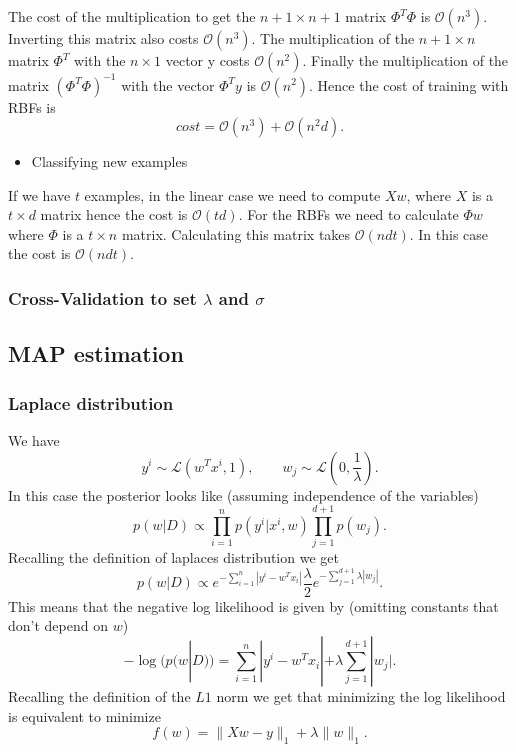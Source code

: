 \documentclass[11pt]{article}
\theoremstyle{plain}
\begin{document}
The cost of the multiplication to get the $n+1\times n+1$
matrix  $\Phi^{T}\Phi$ is $\mathcal{O}(n^{3})$. Inverting this matrix also costs $\mathcal{O}(n^{3})$.
The multiplication of the $n+1\times n$ matrix $\Phi^{T}$ with the $n\times 1$ vector y costs
$\mathcal{O}(n^{2})$. Finally the multiplication of the matrix $(\Phi^{T}\Phi)^{-1}$ with the vector
$\Phi^{T}y$ is $\mathcal{O}(n^{2})$. Hence the cost of training with RBFs is
\begin{equation*}
cost=\mathcal{O}(n^{3})+\mathcal{O}(n^{2}d).
\end{equation*}
\begin{itemize}
\item{Classifying new examples}
\end{itemize}
If we have $t$ examples, in the linear case we need to compute $Xw$, where $X$ is a $t\times d$ matrix
hence the cost is $\mathcal{O}(td)$. For the RBFs we need to calculate $\Phi w$ where $\Phi$ is 
 a $t\times n$ matrix. Calculating this matrix takes $\mathcal{O}(ndt)$. In this case the cost is $\mathcal{O}(ndt)$.

\subsubsection{Cross-Validation to set $\lambda$ and $\sigma$}

\subsection{MAP estimation}
\subsubsection{Laplace distribution}
We have
\begin{equation*}
y^{i}\sim\mathcal{L}(w^{T}x^{i},1),\qquad w_{j}\sim\mathcal{L}(0,\frac{1}{\lambda}).
\end{equation*}
In this case the posterior looks like (assuming independence of the variables)
\begin{equation*}
p(w|D)\propto\prod_{i=1}^{n}p(y^{i}|x^{i},w)\prod_{j=1}^{d+1}p(w_{j}).
\end{equation*}
Recalling the definition of laplaces distribution we get
\begin{equation*}
p(w|D)\propto e^{-\sum_{i=1}^{n}|y^{i}-w^{T}x_{i}|}\frac{\lambda}{2}e^{-\sum_{j=1}^{d+1}\lambda|w_{j}|}.
\end{equation*}
This means that the negative log likelihood is given by (omitting constants that don't depend on $w$)
\begin{equation*}
-\log(p(w|D))=\sum_{i=1}^{n}|y^{i}-w^{T}x_{i}|+\lambda\sum_{j=1}^{d+1} |w_{j}|.
\end{equation*}
Recalling the definition of the $L1$ norm we get that minimizing the log likelihood
is equivalent to minimize
\begin{equation*}
f(w)=\|Xw-y\|_{1}+\lambda\|w\|_{1}.
\end{equation*}
\end{document}
